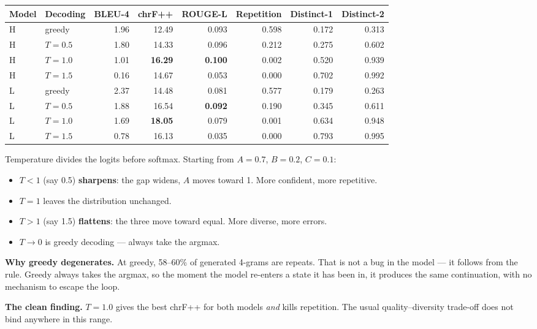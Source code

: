 \documentclass[11pt]{report}
\begin{document}
\begin{center}\small
\begin{tabular}{llrrrrrr}
\toprule
\textbf{Model} & \textbf{Decoding} & \textbf{BLEU-4} & \textbf{chrF++} & \textbf{ROUGE-L} & \textbf{Repetition} & \textbf{Distinct-1} & \textbf{Distinct-2} \\
\midrule
H & greedy & 1.96 & 12.49 & 0.093 & 0.598 & 0.172 & 0.313 \\
H & $T=0.5$ & 1.80 & 14.33 & 0.096 & 0.212 & 0.275 & 0.602 \\
H & $T=1.0$ & 1.01 & \textbf{16.29} & \textbf{0.100} & 0.002 & 0.520 & 0.939 \\
H & $T=1.5$ & 0.16 & 14.67 & 0.053 & 0.000 & 0.702 & 0.992 \\
\midrule
L & greedy & 2.37 & 14.48 & 0.081 & 0.577 & 0.179 & 0.263 \\
L & $T=0.5$ & 1.88 & 16.54 & \textbf{0.092} & 0.190 & 0.345 & 0.611 \\
L & $T=1.0$ & 1.69 & \textbf{18.05} & 0.079 & 0.001 & 0.634 & 0.948 \\
L & $T=1.5$ & 0.78 & 16.13 & 0.035 & 0.000 & 0.793 & 0.995 \\
\bottomrule
\end{tabular}
\end{center}

\begin{vexample}
Temperature divides the logits before softmax. Starting from $A = 0.7$,
$B = 0.2$, $C = 0.1$:
\begin{itemize}
\item $T < 1$ (say 0.5) \textbf{sharpens}: the gap widens, $A$ moves toward 1.
More confident, more repetitive.
\item $T = 1$ leaves the distribution unchanged.
\item $T > 1$ (say 1.5) \textbf{flattens}: the three move toward equal. More
diverse, more errors.
\item $T \to 0$ is greedy decoding --- always take the argmax.
\end{itemize}
\end{vexample}

\begin{deeper}
\textbf{Why greedy degenerates.} At greedy, 58--60\% of generated 4-grams are
repeats. That is not a bug in the model --- it follows from the rule. Greedy
always takes the argmax, so the moment the model re-enters a state it has been
in, it produces the same continuation, with no mechanism to escape the loop.

\medskip
\textbf{The clean finding.} $T = 1.0$ gives the best chrF++ for both models
\emph{and} kills repetition. The usual quality--diversity trade-off does not
bind anywhere in this range.
\end{deeper}
\end{document}
